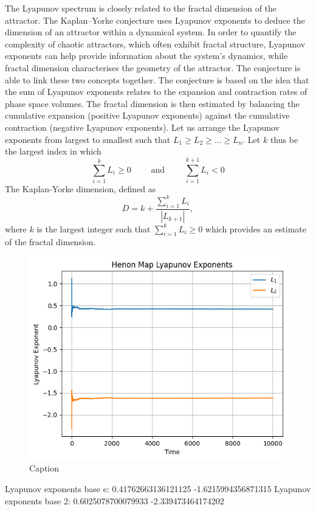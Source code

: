 The Lyapunov spectrum is closely related to the fractal dimension of the attractor. The Kaplan–Yorke conjecture uses Lyapunov exponents to deduce the dimension of an attractor within a dynamical system. In order to quantify the complexity of chaotic attractors, which often exhibit fractal structure, Lyapunov exponents can help provide information about the system's dynamics, while fractal dimension characterises the geometry of the attractor. The conjecture is able to link these two concepts together. The conjecture is based on the idea that the sum of Lyapunov exponents relates to the expansion and contraction rates of phase space volumes. The fractal dimension is then estimated by balancing the cumulative expansion (positive Lyapunov exponents) against the cumulative contraction (negative Lyapunov exponents). Let us arrange the Lyapunov exponents from largest to smallest such that $L_1 \geq L_2 \geq \dots \geq L_n$. Let $k$ thus be the largest index in which
$$
\sum_{i=1}^k L_i\geq 0 \quad\quad \text{ and } \quad \quad \sum_{i=1}^{k+1} L_i <0
$$
The Kaplan-Yorke dimension, defined as
$$
D = k + \frac{\sum_{i=1}^k L_i}{|L_{k+1}|},
$$
where $k$ is the largest integer such that $\sum_{i=1}^k L_i \geq 0$ which provides an estimate of the fractal dimension.

\begin{exmp}
    \begin{figure}
        \centering
        \includegraphics[width=0.95\linewidth]{Bifurcation Images/lyapunov_henon.png}
        \caption{Caption}
        \label{fig:lyapunov_henon}
    \end{figure}
    Lyapunov exponents base e: 0.41762663136121125 -1.6215994356871315
    Lyapunov exponents base 2: 0.6025078700079933 -2.339473464174202
\end{exmp}

